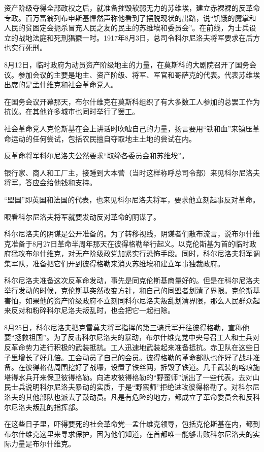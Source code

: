 资产阶级夺得全部政权之后，就准备摧毁软弱无力的苏维埃，建立赤裸裸的反革命专政。百万富翁列布申斯基悍然声称他看到了摆脱现状的出路，说“饥饿的魔掌和人民的贫困定会扼杀冒充人民之友的民主的苏维埃和委员会”。在前线，为士兵设立的战地法庭和死刑猖獗一时。1917年8月3日，总司令科尔尼洛夫将军要求在后方也实行死刑。

8月12日，临时政府为动员资产阶级地主的力量，在莫斯科的大剧院召开了国务会议。参加会议的主要是地主、资产阶级、将军、军官和哥萨克的代表。代表苏维埃出席的是孟什维克和社会革命党人。

在国务会议开幕那天，布尔什维克在莫斯科组织了有大多数工人参加的总罢工作为抗议。在其他许多城市也同时举行了罢工。

社会革命党人克伦斯基在会上讲话时吹嘘自己的力量，扬言要用“铁和血”来镇压革命运动的任何尝试，包括农民擅自夺取地主土地的尝试在内。

反革命将军科尔尼洛夫公然要求“取缔各委员会和苏维埃”。

银行家、商人和工厂主，接踵到大本营（当时这样称呼总司令部）来见科尔尼洛夫将军，答应会给他钱和支持。

“盟国”即英国和法国的代表，也来见科尔尼洛夫将军，要求他立刻起事反对革命。

眼看科尔尼洛夫将军就要发动反对革命的阴谋了。

科尔尼洛夫的阴谋是公开准备的。为了转移视线，阴谋者们散布流言，说布尔什维克准备于8月27日革命半周年那天在彼得格勒举行起义。以克伦斯基为首的临时政府猛攻布尔什维克，对无产阶级政党加紧实行恐怖手段。同时，科尔尼洛夫将军调集军队，准备把它们开到彼得格勒来消灭苏维埃和建立军事独裁政府。

科尔尼洛夫准备这次反革命发动，事先是同克伦斯基商量好的。但是在科尔尼洛夫举行发动的时候，克伦斯基突然改变方针，和自己的同盟者划清了界限。克伦斯基害怕，如果他的资产阶级政府不立刻同科尔尼洛夫叛乱划清界限，那么人民群众起来反对和粉碎科尔尼洛夫叛乱时，也会把它一起扫除。

8月25日，科尔尼洛夫把克雷莫夫将军指挥的第三骑兵军开往彼得格勒，宣称他要“拯救祖国”。为了反击科尔尼洛夫的暴动，布尔什维克党中央号召工人和士兵对反革命势力进行积极的武装抵抗。工人迅速地武装起来准备抵抗。赤卫队在这些日子里增长了好几倍。工会动员了自己的会员。彼得格勒的革命部队也作好了战斗准备。在彼得格勒周围挖好了战壕，设置了铁丝网，拆毁了铁道。几千武装的喀琅施塔得水兵开来保卫彼得格勒。向进攻彼得格勒的“野蛮师”派出了一些代表，去对山民士兵说明科尔尼洛夫暴动的实质，于是“野蛮师”拒绝进攻彼得格勒了。对科尔尼洛夫的其他部队也派去了鼓动员。凡是有危险的地方，都成立了革命委员会和反科尔尼洛夫叛乱的指挥部。

在这些日子里，吓得要死的社会革命党—孟什维克领导，包括克伦斯基在内，都到布尔什维克这里来寻求保护，因为他们知道，在首都唯一能够击败科尔尼洛夫的实际力量是布尔什维克。


